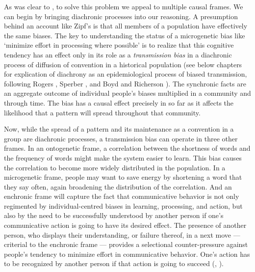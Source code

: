 As was clear to \citet[66ff]{zipf_human_1949}, to solve this problem we appeal to 
multiple causal frames. We can begin by bringing diachronic processes 
into our reasoning. A presumption behind an account like Zipf's is 
that all members of a population have effectively the same biases. The key to understanding the status of a microgenetic bias like 
\textquoteleft minimize effort in processing where possible' is to realize that this 
cognitive tendency has an effect only in its role as a \textit{transmission bias} in a diachronic process of diffusion of convention 
in a historical population (see below chapters for explication of 
diachrony as an epidemiological process of biased transmission, 
following Rogers \citeyear{rogers_diffusion_2003}, Sperber \citeyear{sperber_anthropology_1985}, and Boyd and Richerson \citeyear{boyd_culture_1985,boyd_origin_2005}). The synchronic facts are an aggregate outcome of individual people's biases multiplied in a community and through time. The bias has a 
causal effect precisely in so far as it affects the likelihood that a
pattern will spread throughout that community. 



Now, while the spread of a pattern and its maintenance as a convention in a group are diachronic processes, a transmission bias can operate in three other frames. In an ontogenetic frame, a correlation between the shortness of words and the frequency of words might make the system easier to learn. This bias causes the correlation to become more widely distributed in the population. In a microgenetic frame, people may want to save energy by shortening a word that they say often, again broadening the distribution of the correlation. And an enchronic frame will capture the fact that communicative behavior is not only regimented by individual-centred biases in learning, processing, and action, but also by the need to be successfully understood by another person if one's communicative action is going to have its desired effect. The presence of another person, who displays their understanding, or failure thereof, in a next move --- criterial to the enchronic frame --- provides a selectional counter-pressure against people's tendency to minimize effort in communicative behavior. One's action has to be recognized by another person if that action is going to succeed (\citealt[21]{zipf_human_1949}, \citealt[Chapter 9]{enfield_relationship_2013}).



